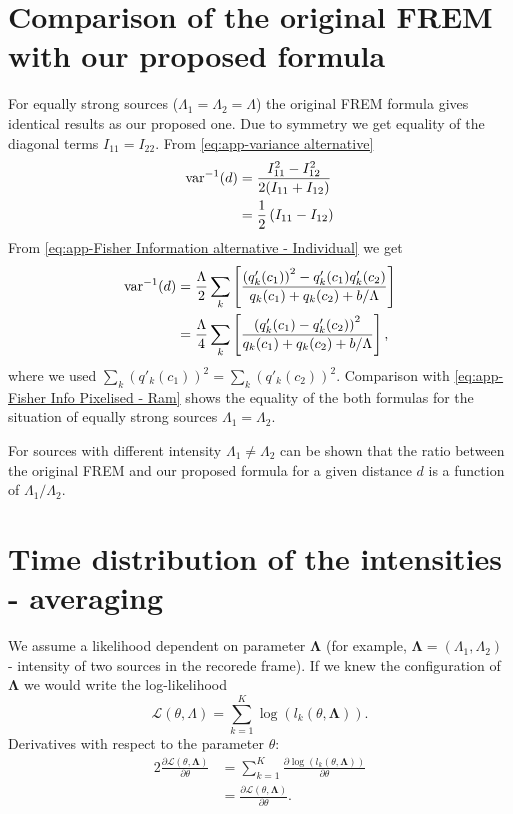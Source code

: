 \section{Comparison of the original FREM with our proposed formula}
For equally strong sources ($\Lambda_1= \Lambda_2=\Lambda$) the original FREM formula gives identical results as our proposed one. Due to symmetry we get equality of the diagonal terms $I_{11}=I_{22}$. From \autoref{eq:app-variance alternative}
\begin{alignat}{2}
	\mathrm{var}^{-1}(d)
	&=\frac{I_{11}^2-I_{12}^2}{2(I_{11}+I_{12})}\\
	&=\frac{1}{2}\left(I_{11}-I_{12}\right)
\end{alignat}
%
From  \autoref{eq:app-Fisher Information alternative - Individual} we get
\begin{alignat}{2}
	\mathrm{var}^{-1}(d)
	&=\frac{\Lambda}{2}\sum_k\left[\frac{\left(q'_k(c_1)\right)^2-q'_k(c_1)q'_k(c_2)}{q_k(c_1)+q_k(c_2)+b/\Lambda} \right]\\
	&=\frac{\Lambda}{4}\sum_k\left[\frac{\left(q'_k(c_1)-q'_k(c_2)\right)^2}{q_k(c_1)+q_k(c_2)+b/\Lambda} \right],
\end{alignat}
% 
where we used $\sum_k\left(q'_k(c_1)\right)^2=\sum_k\left(q'_k(c_2)\right)^2$. Comparison with \autoref{eq:app-Fisher Info Pixelised - Ram} shows the equality of the both formulas for the situation of equally strong sources $\Lambda_1=\Lambda_2$.

For sources with different intensity $\Lambda_1\neq\Lambda_2$ can be shown that the ratio between the original FREM and our proposed formula for a given distance $d$ is a function of $\Lambda_1/\Lambda_2$. 


\section{Time distribution of the intensities - averaging\label{sec:Appendix - blinking not integrated}}
We assume a likelihood dependent on parameter $\bm{\Lambda}$ (for example, $\bm{\Lambda}=(\Lambda_1,\Lambda_2)$ - intensity of two sources in the recorede frame). If we knew the configuration of $\bm{\Lambda}$ we would write the log-likelihood
%
\begin{equation}
	\mathcal{L}(\theta,\Lambda)=\sum_{k=1}^K\log\left(l_k(\theta,\bm{\Lambda})\right).
\end{equation}
%
Derivatives with respect to the parameter $\theta$:
%
\begin{alignat}{2}
	\frac{\partial\mathcal{L}(\theta,\bm{\Lambda})}{\partial \theta}
	&=\sum_{k=1}^K\frac{\partial\log\left(l_k(\theta,\bm{\Lambda})\right)}{\partial \theta}\\
	&=\frac{\partial\mathcal{L}(\theta,\bm{\Lambda})}{\partial \theta}. 
\end{alignat}


